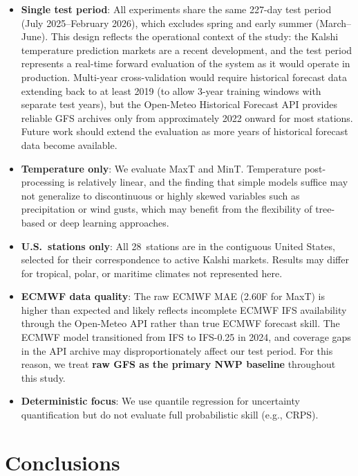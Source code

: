 \documentclass{ametsocV6.1}
\begin{document}
\begin{itemize}
  \item \textbf{Single test period}: All experiments share the same 227-day test
    period (July 2025--February 2026), which excludes spring and early summer
    (March--June). This design reflects the operational context of the study: the
    Kalshi temperature prediction markets are a recent development, and the test
    period represents a real-time forward evaluation of the system as it would
    operate in production. Multi-year cross-validation would require historical
    forecast data extending back to at least 2019 (to allow 3-year training windows
    with separate test years), but the Open-Meteo Historical Forecast API provides
    reliable GFS archives only from approximately 2022 onward for most stations.
    Future work should extend the evaluation as more years of historical forecast
    data become available.
  \item \textbf{Temperature only}: We evaluate MaxT and MinT. Temperature
    post-processing is relatively linear, and the finding that simple models suffice
    may not generalize to discontinuous or highly skewed variables such as
    precipitation or wind gusts, which may benefit from the flexibility of
    tree-based or deep learning approaches.
  \item \textbf{U.S.\ stations only}: All 28~stations are in the contiguous United
    States, selected for their correspondence to active Kalshi markets. Results may
    differ for tropical, polar, or maritime climates not represented here.
  \item \textbf{ECMWF data quality}: The raw ECMWF MAE (2.60\textdegree{}F for
    MaxT) is higher than expected and likely reflects incomplete ECMWF IFS
    availability through the Open-Meteo API rather than true ECMWF forecast skill.
    The ECMWF model transitioned from IFS to IFS-0.25\textdegree{} in 2024, and
    coverage gaps in the API archive may disproportionately affect our test period.
    For this reason, we treat \textbf{raw GFS as the primary NWP baseline}
    throughout this study.
  \item \textbf{Deterministic focus}: We use quantile regression for uncertainty
    quantification but do not evaluate full probabilistic skill (e.g., CRPS).
\end{itemize}

\section{Conclusions}
\label{sec:conclusions}
\end{document}
